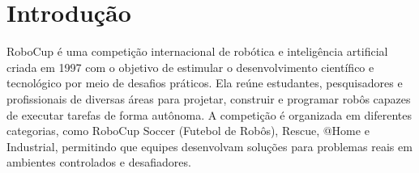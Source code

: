 \documentclass[journal]{IEEEtran}
\begin{document}
%



\section{Introdução}

 RoboCup é uma competição internacional de robótica e inteligência artificial criada em 1997 com o objetivo de estimular o desenvolvimento científico e tecnológico por meio de desafios práticos. Ela reúne estudantes, pesquisadores e profissionais de diversas áreas para projetar, construir e programar robôs capazes de executar tarefas de forma autônoma. A competição é organizada em diferentes categorias, como RoboCup Soccer (Futebol de Robôs), Rescue, @Home e Industrial, permitindo que equipes desenvolvam soluções para problemas reais em ambientes controlados e desafiadores.
\end{document}

